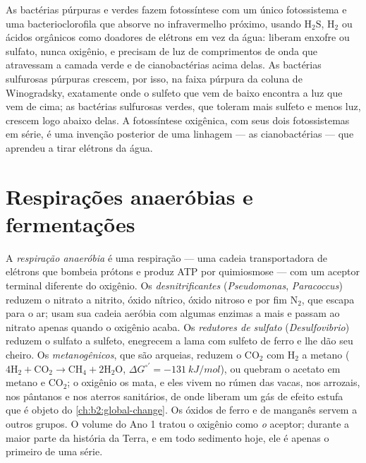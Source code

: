 \begin{definition}\label{def:b2:microbial-metabolism:anoxygenic}
As bactérias púrpuras e verdes fazem fotossíntese com um único
fotossistema e uma bacterioclorofila que absorve no infravermelho
próximo, usando $\mathrm{H_2S}$, $\mathrm{H_2}$ ou ácidos orgânicos
como doadores de elétrons em vez da água: liberam enxofre ou sulfato,
nunca oxigênio, e precisam de luz de comprimentos de onda que
atravessam a camada verde e de cianobactérias acima delas. As
bactérias sulfurosas púrpuras crescem, por isso, na faixa púrpura da
coluna de Winogradsky, exatamente onde o sulfeto que vem de baixo
encontra a luz que vem de cima; as bactérias sulfurosas verdes, que
toleram mais sulfeto e menos luz, crescem logo abaixo delas. A
fotossíntese oxigênica, com seus dois fotossistemas em série, é uma
invenção posterior de uma linhagem --- as cianobactérias --- que
aprendeu a tirar elétrons da água.
\end{definition}

\section{Respirações anaeróbias e fermentações}

\begin{definition}\label{def:b2:microbial-metabolism:anaerobic}
A \emph{respiração anaeróbia} é uma respiração --- uma cadeia
transportadora de elétrons que bombeia prótons e produz ATP por
quimiosmose --- com um aceptor terminal diferente do oxigênio. Os
\emph{desnitrificantes} (\emph{Pseudomonas}, \emph{Paracoccus})
reduzem o nitrato a nitrito, óxido nítrico, óxido nitroso e por fim
$\mathrm{N_2}$, que escapa para o ar; usam sua cadeia aeróbia com
algumas enzimas a mais e passam ao nitrato apenas quando o oxigênio
acaba. Os \emph{redutores de sulfato} (\emph{Desulfovibrio}) reduzem o
sulfato a sulfeto, enegrecem a lama com sulfeto de ferro e lhe dão
seu cheiro. Os \emph{metanogênicos},
que são arqueias, reduzem o $\mathrm{CO_2}$ com $\mathrm{H_2}$ a
metano ($4\mathrm{H_2} + \mathrm{CO_2} \to \mathrm{CH_4} +
2\mathrm{H_2O}$, $\Delta G^{\circ\prime} = \qty{-131}{kJ/mol}$), ou
quebram o acetato em metano e $\mathrm{CO_2}$; o oxigênio os mata, e
eles vivem no rúmen das vacas, nos arrozais, nos pântanos e nos
aterros sanitários, de onde liberam um gás de efeito estufa que é
objeto do \cref{ch:b2:global-change}. Os óxidos de ferro e de manganês servem a outros
grupos. O volume do Ano 1 tratou o oxigênio como \emph{o} aceptor;
durante a maior parte da história da Terra, e em todo sedimento hoje,
ele é apenas o primeiro de uma série.
\end{definition}

